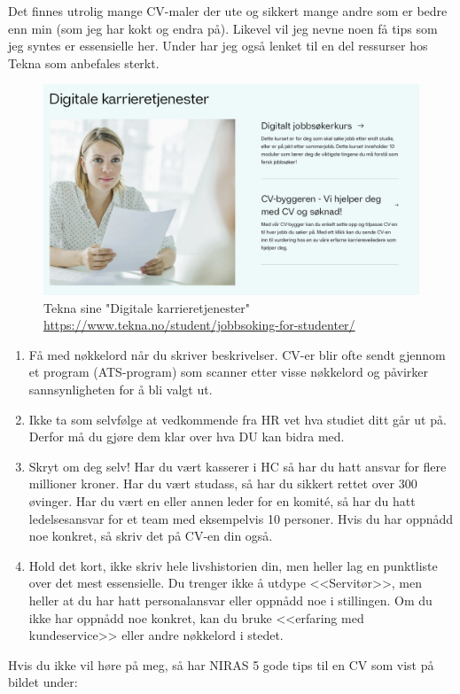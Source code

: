 Det finnes utrolig mange CV-maler der ute og sikkert mange andre som er bedre enn min (som jeg har kokt og endra på). Likevel vil jeg nevne noen få tips som jeg syntes er essensielle her. Under har jeg også lenket til en del ressurser hos Tekna som anbefales sterkt. 

\begin{figure}[H]
    \centering
    \includegraphics[width=0.75\linewidth]{images/Tekna-jobb.png}
    \caption{Tekna sine "Digitale karrieretjenester" \url{https://www.tekna.no/student/jobbsoking-for-studenter/}}
    \label{fig:Tekna-jobb}
\end{figure}

\begin{enumerate}
    \item Få med nøkkelord når du skriver beskrivelser. CV-er blir ofte sendt gjennom et program (ATS-program) som scanner etter visse nøkkelord og påvirker sannsynligheten for å bli valgt ut. 
    \item Ikke ta som selvfølge at vedkommende fra HR vet hva studiet ditt går ut på. Derfor må du gjøre dem klar over hva DU kan bidra med. 
    \item Skryt om deg selv! Har du vært kasserer i HC så har du hatt ansvar for flere millioner kroner. Har du vært studass, så har du sikkert rettet over 300 øvinger. Har du vært en eller annen leder for en komité, så har du hatt ledelsesansvar for et team med eksempelvis 10 personer. Hvis du har oppnådd noe konkret, så skriv det på CV-en din også. 
    \item Hold det kort, ikke skriv hele livshistorien din, men heller lag en punktliste over det mest essensielle. Du trenger ikke å utdype <<Servitør>>, men heller at du har hatt personalansvar eller oppnådd noe i stillingen. Om du ikke har oppnådd noe konkret, kan du bruke <<erfaring med kundeservice>> eller andre nøkkelord i stedet. 
\end{enumerate}

Hvis du ikke vil høre på meg, så har NIRAS 5 gode tips til en CV som vist på bildet under:

